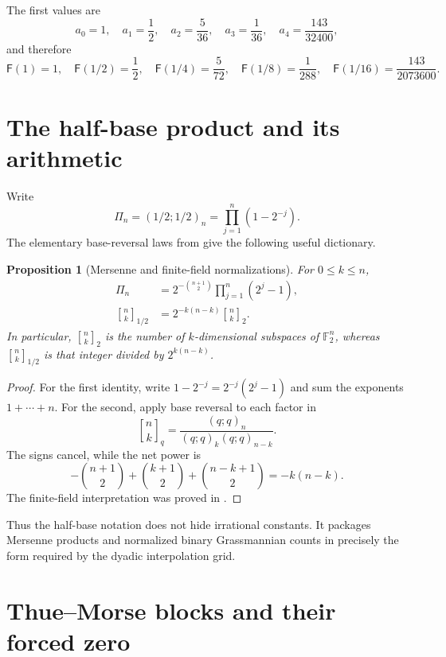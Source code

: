 \documentclass[11pt,oneside,openany]{book}
\newtheorem{proposition}[theorem]{Proposition}
\theoremstyle{definition}
\theoremstyle{remark}
\newcommand{\Qbinom}[3]{\genfrac{[}{]}{0pt}{}{#1}{#2}_{#3}}
\newcommand{\poch}[3]{(#1;#2)_{#3}}
\newcommand{\F}{\mathbb F}
\newcommand{\Fab}{\mathsf F}
\begin{document}
The first values are
\[
 a_0=1,
 \quad a_1=\frac12,
 \quad a_2=\frac5{36},
 \quad a_3=\frac1{36},
 \quad a_4=\frac{143}{32400},
\]
and therefore
\[
 \Fab(1)=1,
 \quad \Fab(1/2)=\frac12,
 \quad \Fab(1/4)=\frac5{72},
 \quad \Fab(1/8)=\frac1{288},
 \quad \Fab(1/16)=\frac{143}{2073600}.
\]

\section{The half-base product and its arithmetic}

Write
\begin{equation}\label{eq:fabius-Pi-n}
 \Pi_n=\poch{1/2}{1/2}{n}=\prod_{j=1}^n(1-2^{-j}).
\end{equation}
The elementary base-reversal laws from 
give the following useful dictionary.

\begin{proposition}[Mersenne and finite-field normalizations]\label{prop:half-base-arithmetic}
For $0\le k\le n$,
\begin{align}
 \Pi_n
 &=2^{-\binom{n+1}{2}}\prod_{j=1}^n(2^j-1),
 \label{eq:fabius-Pi-Mersenne}\\
 \Qbinom nk{1/2}
 &=2^{-k(n-k)}\Qbinom nk2.
 \label{eq:fabius-half-two}
\end{align}
In particular, $\Qbinom nk2$ is the number of $k$-dimensional subspaces of
$\F_2^n$, whereas $\Qbinom nk{1/2}$ is that integer divided by
$2^{k(n-k)}$.
\end{proposition}

\begin{proof}
For the first identity, write
$1-2^{-j}=2^{-j}(2^j-1)$ and sum the exponents $1+\cdots+n$.
For the second, apply base reversal to each factor in
\[
 \Qbinom nkq=\frac{(q;q)_n}{(q;q)_k(q;q)_{n-k}}.
\]
The signs cancel, while the net power is
\[
 -\binom{n+1}{2}+\binom{k+1}{2}+\binom{n-k+1}{2}
 =-k(n-k).
\]
The finite-field interpretation was proved in .
\end{proof}

Thus the half-base notation does not hide irrational constants.  It packages
Mersenne products and normalized binary Grassmannian counts in precisely the
form required by the dyadic interpolation grid.

\section{Thue--Morse blocks and their forced zero}
\end{document}
